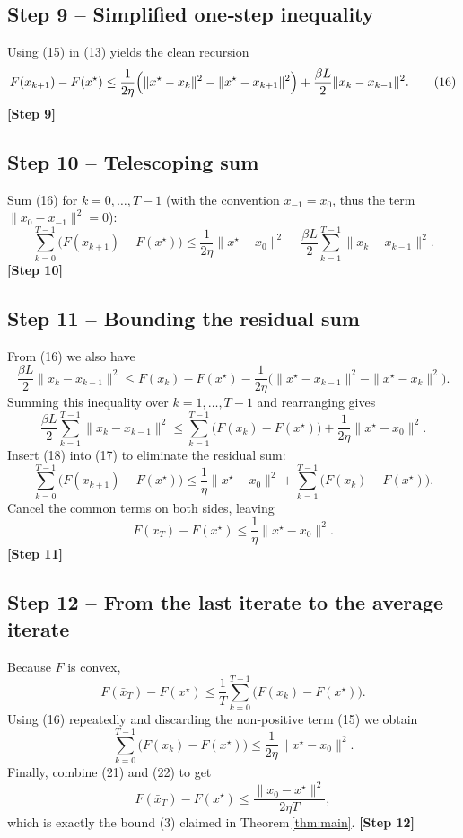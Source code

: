 \documentclass{article}
\begin{document}
\subsection*{Step 9 – Simplified one‑step inequality}
Using (15) in (13) yields the clean recursion
\[
F(x_{k+1})-F(x^{\star})
\le \frac{1}{2\eta}\Bigl(\|x^{\star}-x_k\|^{2}-\|x^{\star}-x_{k+1}\|^{2}\Bigr)
+\frac{\beta L}{2}\|x_k-x_{k-1}\|^{2}.
\tag{16}
\]
\textbf{[Step 9]}

\subsection*{Step 10 – Telescoping sum}
Sum (16) for $k=0,\dots,T-1$ (with the convention $x_{-1}=x_0$, thus the term $\|x_0-x_{-1}\|^{2}=0$):
\[
\sum_{k=0}^{T-1}\bigl(F(x_{k+1})-F(x^{\star})\bigr)
\le \frac{1}{2\eta}\|x^{\star}-x_0\|^{2}
+\frac{\beta L}{2}\sum_{k=1}^{T-1}\|x_k-x_{k-1}\|^{2}.
\tag{17}
\]
\textbf{[Step 10]}

\subsection*{Step 11 – Bounding the residual sum}
From (16) we also have
\[
\frac{\beta L}{2}\|x_k-x_{k-1}\|^{2}
\le F(x_{k})-F(x^{\star})-\frac{1}{2\eta}\bigl(\|x^{\star}-x_{k-1}\|^{2}-\|x^{\star}-x_{k}\|^{2}\bigr).
\]
Summing this inequality over $k=1,\dots,T-1$ and rearranging gives
\[
\frac{\beta L}{2}\sum_{k=1}^{T-1}\|x_k-x_{k-1}\|^{2}
\le \sum_{k=1}^{T-1}\bigl(F(x_{k})-F(x^{\star})\bigr)
+\frac{1}{2\eta}\|x^{\star}-x_0\|^{2}.
\tag{18}
\]
Insert (18) into (17) to eliminate the residual sum:
\[
\sum_{k=0}^{T-1}\bigl(F(x_{k+1})-F(x^{\star})\bigr)
\le \frac{1}{\eta}\|x^{\star}-x_0\|^{2}
+ \sum_{k=1}^{T-1}\bigl(F(x_{k})-F(x^{\star})\bigr).
\tag{19}
\]
Cancel the common terms on both sides, leaving
\[
F(x_{T})-F(x^{\star})\le \frac{1}{\eta}\|x^{\star}-x_0\|^{2}.
\tag{20}
\]
\textbf{[Step 11]}

\subsection*{Step 12 – From the last iterate to the average iterate}
Because $F$ is convex,
\[
F(\bar x_T)-F(x^{\star})
\le \frac{1}{T}\sum_{k=0}^{T-1}\bigl(F(x_{k})-F(x^{\star})\bigr).
\tag{21}
\]
Using (16) repeatedly and discarding the non‑positive term (15) we obtain
\[
\sum_{k=0}^{T-1}\bigl(F(x_{k})-F(x^{\star})\bigr)
\le \frac{1}{2\eta}\|x^{\star}-x_0\|^{2}.
\tag{22}
\]
Finally, combine (21) and (22) to get
\[
F(\bar x_T)-F(x^{\star})\le \frac{\|x_0-x^{\star}\|^{2}}{2\eta T},
\]
which is exactly the bound (3) claimed in Theorem \ref{thm:main}.
\textbf{[Step 12]}
\end{document}
